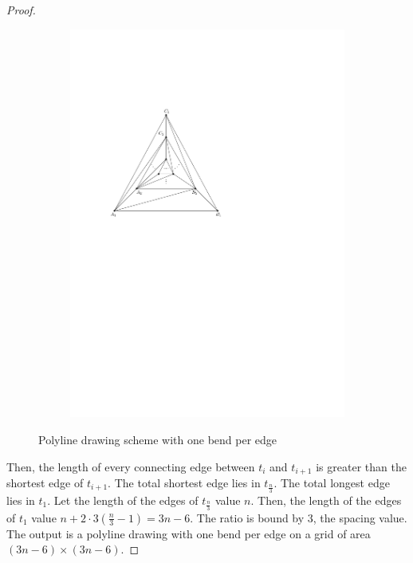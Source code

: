 \begin{proof}
\begin{figure}[H]
\begin{subfigure}{0.8\linewidth}
			\includegraphics[width=\textwidth,page=2]{drawings/3-tree.pdf}
		\end{subfigure}
		\caption{Polyline drawing scheme with one bend per edge}\label{im:3trees-drawing}
	\end{figure}	
	Then, the length of every connecting edge between $t_i$ and $t_{i+1}$ is greater than the shortest edge of $t_{i+1}$. The total shortest edge lies in $t_{\frac{n}{3}}$. The total longest edge lies in $t_1$. Let the length of the edges of $t_{\frac{n}{3}}$ value $n$. Then, the length of the edges of $t_1$ value $n+2\cdot 3\left(\frac{n}{3}-1\right) = 3n-6$. The ratio is bound by 3, the spacing value. The output is a polyline drawing with one bend per edge on a grid of area $(3n-6)\times(3n-6)$.
\end{proof}
